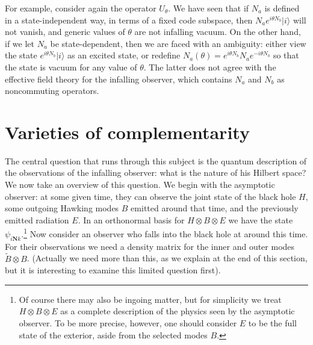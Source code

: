 \documentclass[12pt]{article}
\newcommand{\sect}[1]{\section{#1}\setcounter{equation}{0}}
\begin{document}
For example, consider again the operator $U_\theta$.  We have seen that
if  $N_a$ is defined in a state-independent way, in terms of a fixed code subspace, then $N_a e^{i\theta N_b}|i\rangle$ will not vanish, and %
generic values of $\theta$ are not infalling vacuum. On the other hand, if we let $N_a$ be state-dependent, then we are faced with an ambiguity: either view the state
$e^{i\theta N_b}|i\rangle$ as an excited state, or redefine $N_{a}(\theta) = e^{i\theta N_b}N_a e^{-i\theta N_b}$ so that the state is vacuum for any value of $\theta$.  The latter does not agree with the effective field theory for the infalling observer, which contains $N_a$ and $N_b$ as noncommuting operators.



\sect{Varieties of complementarity}

The central question that runs through this subject is the quantum description of the observations of the infalling observer: what  is the nature of his Hilbert space?   We now take an overview of this question.  We begin with the asymptotic observer: at some given time, they can observe the joint state of the black hole $H$, some outgoing Hawking modes $B$ emitted around that time, and the previously emitted radiation $E$.  In an orthonormal basis for $H \otimes B \otimes E$ we have the state $\psi_{i\bm Nk}$.\footnote{Of course there may also be ingoing matter, but for simplicity we treat $H \otimes B \otimes E$ as a complete description of the physics seen by the asymptotic observer.  To be more precise, however, one should consider $E$ to be the full state of the exterior, aside from the selected modes $B$.}
Now consider an observer who falls into the black hole at around this time.  For their observations we need a density matrix for the inner and outer modes $\tilde B \otimes B$.  {(Actually we need more than this, as we explain at the end of this section, but it is interesting to examine this limited question first).}
\end{document}
